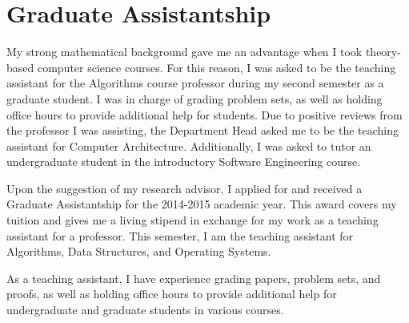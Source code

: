 \section{Graduate Assistantship}
My strong mathematical background gave me an advantage when I took theory-based computer science courses. For this reason, I was asked to be the teaching assistant for the Algorithms course professor during my second semester as a graduate student. I was in charge of grading problem sets, as well as holding office hours to provide additional help for students. Due to positive reviews from the professor I was assisting, the Department Head asked me to be the teaching assistant for Computer Architecture. Additionally, I was asked to tutor an undergraduate student in the introductory Software Engineering course.

Upon the suggestion of my research advisor, I applied for and received a Graduate Assistantship for the 2014-2015 academic year. This award covers my tuition and gives me a living stipend in exchange for my work as a teaching assistant for a professor. This semester, I am the teaching assistant for Algorithms, Data Structures, and Operating Systems.

As a teaching assistant, I have experience grading papers, problem sets, and proofs, as well as holding office hours to provide additional help for undergraduate and graduate students in various courses. 